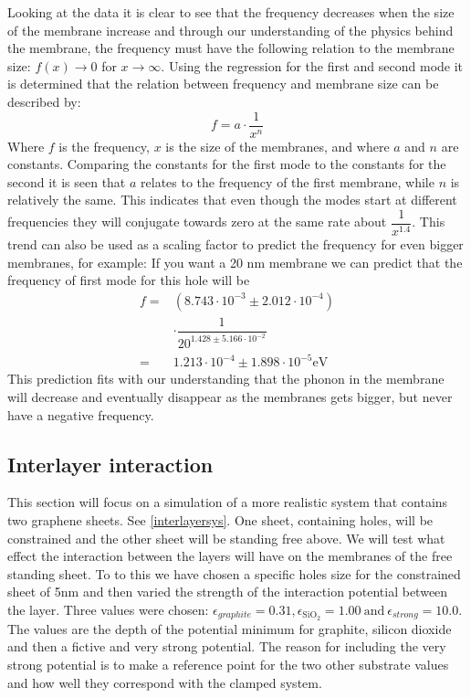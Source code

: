 Looking at the data it is clear to see that the frequency decreases when the size of the membrane increase and through our understanding of the physics behind the membrane, the frequency must have the following relation to the membrane size: $f(x)\rightarrow0$ for $x\rightarrow\infty$. Using the regression for the first and second mode it is determined that the relation between frequency and membrane size can be described by:\begin{equation}
    f=a\cdot\dfrac{1}{x^n}
\end{equation}Where $f$ is the frequency, $x$ is the size of the membranes, and where $a$ and $n$ are constants. Comparing the constants for the first mode to the constants for the second it is seen that $a$ relates to the frequency of the first membrane, while $n$ is relatively the same. This indicates that even though the modes start at different frequencies they will conjugate towards zero at the same rate about $\dfrac{1}{x^{1.4}}$. This trend can also be used as a scaling factor to predict the frequency for even bigger membranes, for example: If you want a 20 nm membrane we can predict that the frequency of first mode for this hole will be
    \begin{align}
     f = & \left(8.743\cdot10^{-3}\pm2.012\cdot10^{-4}\right)\\
    & \cdot\dfrac{1}{20^{1.428\pm5.166\cdot10^{-2}}}\\
    = & 1.213\cdot10^{-4}\pm 1.898\cdot 10^{-5} \mathrm{eV}
    \end{align}
This prediction fits with our understanding that the phonon in the membrane will decrease and eventually disappear as the membranes gets bigger, but never have a negative frequency.

\subsection{Interlayer interaction}
This section will focus on a simulation of a more realistic system that contains two graphene sheets. See \cref{interlayersys}. One sheet, containing holes, will be constrained and the other sheet will be standing free above. We will test what effect the interaction between the layers will have on the membranes of the free standing sheet. To to this we have chosen a specific holes size for the constrained sheet of 5nm and then varied the strength of the interaction potential between the layer. Three values were chosen: $\epsilon_{graphite}=0.31, \epsilon_{\text{SiO}_{2}}=1.00 \ \text{and} \ \epsilon_{strong}=10.0$. The values are the depth of the potential minimum for graphite, silicon dioxide and then a fictive and very strong potential. The reason for including the very strong potential is to make a reference point for the two other substrate values and how well they correspond with the clamped system. 
\onecolumngrid

